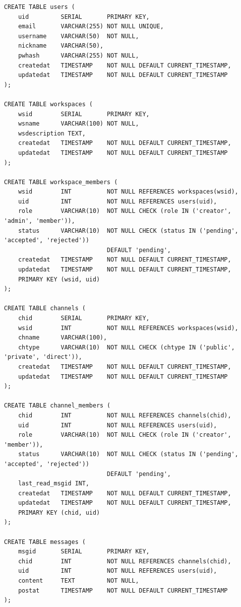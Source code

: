 \documentclass[11pt]{article}
\begin{document}
\begin{lstlisting}
CREATE TABLE users (
    uid         SERIAL       PRIMARY KEY,
    email       VARCHAR(255) NOT NULL UNIQUE,
    username    VARCHAR(50)  NOT NULL,
    nickname    VARCHAR(50),
    pwhash      VARCHAR(255) NOT NULL,
    createdat   TIMESTAMP    NOT NULL DEFAULT CURRENT_TIMESTAMP,
    updatedat   TIMESTAMP    NOT NULL DEFAULT CURRENT_TIMESTAMP
);

CREATE TABLE workspaces (
    wsid        SERIAL       PRIMARY KEY,
    wsname      VARCHAR(100) NOT NULL,
    wsdescription TEXT,
    createdat   TIMESTAMP    NOT NULL DEFAULT CURRENT_TIMESTAMP,
    updatedat   TIMESTAMP    NOT NULL DEFAULT CURRENT_TIMESTAMP
);

CREATE TABLE workspace_members (
    wsid        INT          NOT NULL REFERENCES workspaces(wsid),
    uid         INT          NOT NULL REFERENCES users(uid),
    role        VARCHAR(10)  NOT NULL CHECK (role IN ('creator', 'admin', 'member')),
    status      VARCHAR(10)  NOT NULL CHECK (status IN ('pending', 'accepted', 'rejected'))
                             DEFAULT 'pending',
    createdat   TIMESTAMP    NOT NULL DEFAULT CURRENT_TIMESTAMP,
    updatedat   TIMESTAMP    NOT NULL DEFAULT CURRENT_TIMESTAMP,
    PRIMARY KEY (wsid, uid)
);

CREATE TABLE channels (
    chid        SERIAL       PRIMARY KEY,
    wsid        INT          NOT NULL REFERENCES workspaces(wsid),
    chname      VARCHAR(100),
    chtype      VARCHAR(10)  NOT NULL CHECK (chtype IN ('public', 'private', 'direct')),
    createdat   TIMESTAMP    NOT NULL DEFAULT CURRENT_TIMESTAMP,
    updatedat   TIMESTAMP    NOT NULL DEFAULT CURRENT_TIMESTAMP
);

CREATE TABLE channel_members (
    chid        INT          NOT NULL REFERENCES channels(chid),
    uid         INT          NOT NULL REFERENCES users(uid),
    role        VARCHAR(10)  NOT NULL CHECK (role IN ('creator', 'member')),
    status      VARCHAR(10)  NOT NULL CHECK (status IN ('pending', 'accepted', 'rejected'))
                             DEFAULT 'pending',
    last_read_msgid INT,
    createdat   TIMESTAMP    NOT NULL DEFAULT CURRENT_TIMESTAMP,
    updatedat   TIMESTAMP    NOT NULL DEFAULT CURRENT_TIMESTAMP,
    PRIMARY KEY (chid, uid)
);

CREATE TABLE messages (
    msgid       SERIAL       PRIMARY KEY,
    chid        INT          NOT NULL REFERENCES channels(chid),
    uid         INT          NOT NULL REFERENCES users(uid),
    content     TEXT         NOT NULL,
    postat      TIMESTAMP    NOT NULL DEFAULT CURRENT_TIMESTAMP
);
\end{lstlisting}
\end{document}
